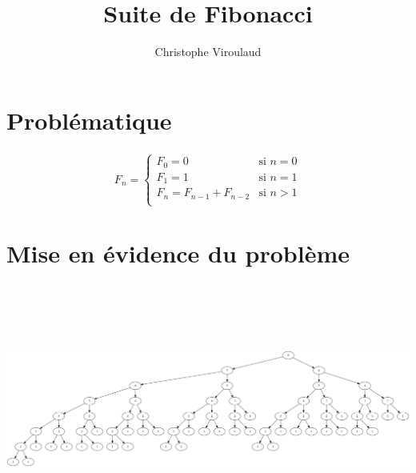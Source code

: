 \documentclass[svgnames,11pt]{beamer}
\author[]{Christophe Viroulaud}
\title{Suite de Fibonacci}
\date{}
\institute{Terminale NSI}
\begin{document}
\begin{frame}
    \titlepage
\end{frame}

\section{Problématique}
\begin{frame}
    \frametitle{}
    $$
        F_n = \left\{
        \begin{array}{ll}
            F_0 = 0                 & \mbox{si } n=0 \\
            F_1=1                   & \mbox{si } n=1 \\
            F_{n} = F_{n-1}+F_{n-2} & \mbox{si } n>1 \\
        \end{array}
        \right.
    $$
    \begin{center}
    \end{center}
\end{frame}

\section{Mise en évidence du problème}
\begin{frame}
    \frametitle{}
    

\end{frame}

\begin{frame}
    \frametitle{}
    \includegraphics[width=\textwidth,height=8cm]{ressources/fibo1.png}

\end{frame}
\end{document}
